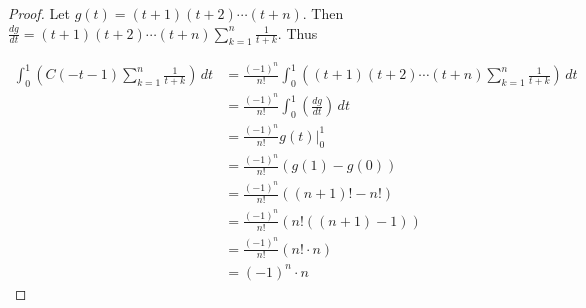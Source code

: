 \begin{proof}
Let $g(t) = (t + 1)(t + 2) \cdots (t + n)$. Then $\displaystyle \frac{dg}{dt} = (t + 1)(t + 2)\cdots(t + n) \sum_{k=1}^{n} \frac{1}{t + k}$. Thus

\begin{align*}
\int_0^1 \left(C(-t - 1) \sum_{k=1}^{n} \frac{1}{t + k} \right) \, dt 
&= \frac{(-1)^n}{n!} \int_0^1 \left( (t + 1)(t + 2)\cdots(t + n) \sum_{k=1}^{n} \frac{1}{t + k} \right) \, dt \\
&= \frac{(-1)^n}{n!} \int_0^1 \left( \frac{dg}{dt} \right) \, dt \\
&= \frac{(-1)^n}{n!} g(t) \Bigg|_0^1 \\
&= \frac{(-1)^n}{n!} (g(1) - g(0)) \\
&= \frac{(-1)^n}{n!} ((n+1)! - n!) \\
&= \frac{(-1)^n}{n!} (n! ((n + 1) - 1)) \\
&= \frac{(-1)^n}{n!} (n! \cdot n) \\
&= (-1)^n \cdot n
\end{align*}
\end{proof}
